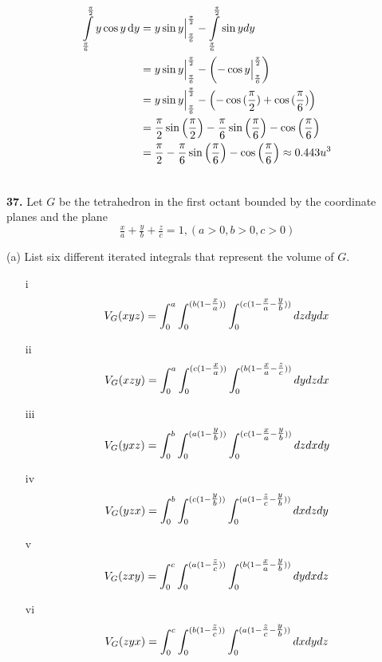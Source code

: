 \documentclass[11pt]{report}
\begin{document}
\begin{align*}
        \int \limits_{\frac{\pi}{6}}^{\frac{\pi}{2}} y
        \cos{y} \, \text dy
        &= y \sin{y} \Big|_{\frac{\pi}{6}}^{\frac{\pi}{2}}
        - \int \limits_{\frac{\pi}{6}}^{\frac{\pi}{2}} \sin{y} dy \\ \notag
        &= y \sin{y} \Big|_{\frac{\pi}{6}}^{\frac{\pi}{2}} - \left( - \cos{y} \Big|_{\frac{\pi}{6}}^{\frac{\pi}{2}} \right) \\ \notag
        &= y \sin{y} \Big|_{\frac{\pi}{6}}^{\frac{\pi}{2}} - \left( - \cos{(\frac{\pi}{2})} + \cos{(\frac{\pi}{6})} \right) \\ \notag
        &= \frac{\pi}{2} \sin{\left( \frac{\pi}{2} \right)} - \frac{\pi}{6} \sin{\left( \frac{\pi}{6} \right)}
        - \cos{\left( \frac{\pi}{6} \right)} \\ \notag
        &= \frac{\pi}{2} - \frac{\pi}{6} \sin{\left( \frac{\pi}{6} \right)}
        - \cos{\left( \frac{\pi}{6} \right)} \approx 0.443 u^3 \\ \notag
\end{align*}

\textbf{37.} Let $G$ be the tetrahedron in the first octant bounded by the
coordinate planes and the plane \\

\[ \tfrac{x}{a} + \tfrac{y}{b} + \tfrac{z}{c} = 1, (a > 0, b > 0, c > 0) \]

(a) List six different iterated integrals that represent the volume of $G$. \\
\begin{itemize}
	\item[i] \[V_G(xyz)=\int_0^{a}\int_0^{(b(1-\tfrac{x}{a}))}\int_0^{(c(1-\tfrac{x}{a}-\tfrac{y}{b}))}dzdydx\]
	\item[ii] \[V_G(xzy)=\int_0^{a}\int_0^{(c(1-\tfrac{x}{a}))}\int_0^{(b(1-\tfrac{x}{a}-\tfrac{z}{c}))}dydzdx\]
	\item[iii] \[V_G(yxz)=\int_0^{b}\int_0^{(a(1-\tfrac{y}{b}))}\int_0^{(c(1-\tfrac{x}{a}-\tfrac{y}{b}))}dzdxdy\]
	\item[iv] \[V_G(yzx)=\int_0^{b}\int_0^{(c(1-\tfrac{y}{b}))}\int_0^{(a(1-\tfrac{z}{c}-\tfrac{y}{b}))}dxdzdy\]
	\item[v] \[V_G(zxy)=\int_0^{c}\int_0^{(a(1-\tfrac{z}{c}))}\int_0^{(b(1-\tfrac{x}{a}-\tfrac{y}{b}))}dydxdz\]
	\item[vi] \[V_G(zyx)=\int_0^{c}\int_0^{(b(1-\tfrac{z}{c}))}\int_0^{(a(1-\tfrac{z}{c}-\tfrac{y}{b}))}dxdydz\]
\end{itemize}
\end{document}
